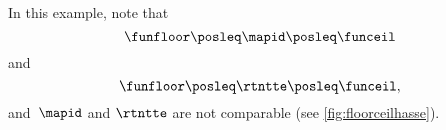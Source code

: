 \begin{example}
    In this example, note that
    \begin{equation*}
        \funfloor \posleq \mapid \posleq \funceil
    \end{equation*}
    and
    \begin{equation*}
        \funfloor \posleq \rtntte \posleq \funceil,
    \end{equation*}
    and~$\mapid$ and $\rtntte$ are not comparable (see \cref{fig:floorceilhasse}).
    \begin{marginfigure}
    \caption{}
    \label{fig:floorceilhasse}
    \end{marginfigure}
\end{example}